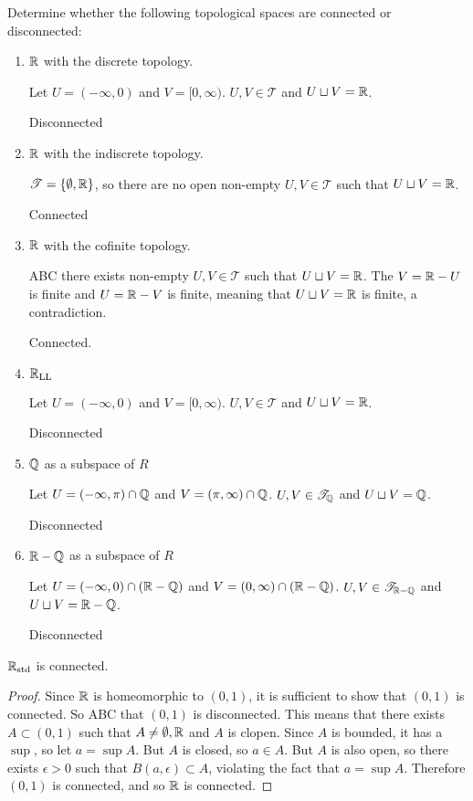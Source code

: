 \documentclass[letterpaper,12pt,fleqn]{article}
\newcommand{\T}{\mathscr{T}}
\newcommand{\e}{\epsilon}
\begin{document}
\begin{example}[Example 8.2]
  Determine whether the following topological spaces are connected or disconnected:
  \begin{enumerate}
  \item \(\mathbb{R}\) with the discrete topology.

    Let \(U=(-\infty,0)\) and \(V=[0,\infty)\).  \(U,V\in\T\) and \(U\sqcup V=\mathbb{R}\).

    Disconnected

  \item \(\mathbb{R}\) with the indiscrete topology.

    \(\T=\set{\emptyset,\R}\), so there are no open non-empty \(U,V\in\T\) such that \(U\sqcup V=\mathbb{R}\).

    Connected

  \item \(\mathbb{R}\) with the cofinite topology.

    ABC there exists non-empty \(U,V\in\T\) such that \(U\sqcup V=\mathbb{R}\).  The \(V=\mathbb{R}-U\) is finite and
    \(U=\mathbb{R}-V\) is finite, meaning that \(U\sqcup V=\mathbb{R}\) is finite, a contradiction.

    Connected.

  \item \(\mathbb{R}_{\text{LL}}\)

    Let \(U=(-\infty,0)\) and \(V=[0,\infty)\).  \(U,V\in\T\) and \(U\sqcup V=\mathbb{R}\).

    Disconnected

  \item \(\mathbb{Q}\) as a subspace of \(R\)

    Let \(U=(-\infty,\pi)\cap\mathbb{Q}\) and \(V=(\pi,\infty)\cap\mathbb{Q}\).  \(U,V\in\T_{\Q}\) and \(U\sqcup V=\mathbb{Q}\).

    Disconnected

  \item \(\mathbb{R}-\mathbb{Q}\) as a subspace of \(R\)

    Let \(U=(-\infty,0)\cap(\mathbb{R}-\mathbb{Q})\) and \(V=(0,\infty)\cap(\mathbb{R}-\mathbb{Q})\).  \(U,V\in\T_{\R-\Q}\) and \(U\sqcup V=\mathbb{R}-\mathbb{Q}\).

    Disconnected
  \end{enumerate}
\end{example}

\begin{theorem}[8.3]
  \(\mathbb{R}_{\text{std}}\) is connected.
\end{theorem}

\begin{proof}
  Since \(\mathbb{R}\) is homeomorphic to \((0,1)\), it is sufficient to show that \((0,1)\) is connected.  So ABC that
  \((0,1)\) is disconnected.  This means that there exists \(A\subset(0,1)\) such that \(A\ne\emptyset,\mathbb{R}\) and
  \(A\) is clopen.  Since \(A\) is bounded, it has a \(\sup\), so let \(a=\sup A\).  But \(A\) is closed, so
  \(a\in A\).  But \(A\) is also open, so there exists \(\e>0\) such that \(B(a,\e)\subset A\), violating the fact
  that \(a=\sup A\).  Therefore \((0,1)\) is connected, and so \(\mathbb{R}\) is connected.
\end{proof}
\end{document}

